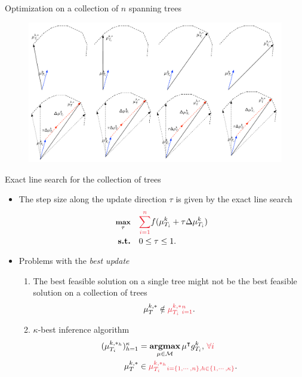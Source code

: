 \documentclass[first=dgreen,second=purple,logo=red]{aaltoslides}
\begin{document}
\begin{frame}{Optimization on a collection of $n$ spanning trees}
	\begin{figure}
		\begin{center}
			\includegraphics[scale=0.3]{best_update.pdf}
		\end{center}
	\end{figure}
\end{frame}

\begin{frame}{Exact line search for the collection of trees}
	\begin{itemize}
		\item The step size along the update direction $\tau$ is given by the exact line search
		\begin{align*}\footnotesize
			\underset{\tau}{\maximize} &\quad {\color{aaltored}\sum_{i=1}^n}f(\vmu_{T_i}^k + \tau\Delta\vmu_{T_i}^{k})\\
			\st &\quad 0\le\tau\le1.
		\end{align*}
		\item Problems with the {\em best update}
		\begin{enumerate}\footnotesize
			\item The best feasible solution on a single tree might not be the best feasible solution on a collection of trees
			\begin{align*}
				{\vmu}_{T}^{k,*}\notin{\color{aaltored}{}{\vmu}_{T_i}^{k,*}{\color{aaltored}}_{i=1}^n}.
			\end{align*}
			\item $\kappa$-best inference algorithm
			\begin{align*}
				({\vmu}_{T_i}^{k,*_h})_{h=1}^{\kappa} &= \underset{\vmu\in\Mcal}{\argmax}\,\vmu\tp g_{T_i}^k,\,{\color{aaltored}\forall i}\\
				{\vmu}_{T}^{k,*} &\in {\color{aaltored}{}{\vmu}_{T_i}^{k,*_h}{\color{aaltored}}_{i=\{1,\cdots,n\},h\in\{1,\cdots,\kappa\}}}.
			\end{align*}
		\end{enumerate}
	\end{itemize}
\end{frame}
\end{document}
